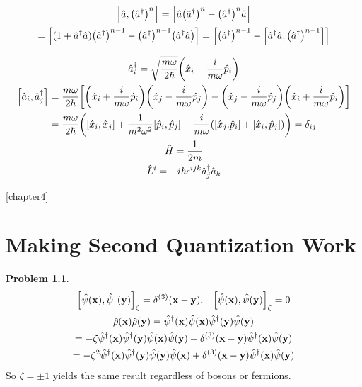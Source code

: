 \documentclass{report}
\theoremstyle{definition}
\begin{document}
\begin{chapter3}
	\begin{gather*}
		\bqty{\hat{a},\pqty{\hat{a}^{\dagger}}^n} = \bqty{\hat{a}\pqty{\hat{a}^{\dagger}}^n - \pqty{\hat{a}^{\dagger}}^n\hat{a}} \\
		= \bqty{(1+\hat{a}^{\dagger}\hat{a})\pqty{\hat{a}^{\dagger}}^{n-1} - \pqty{\hat{a}^{\dagger}}^{n-1}\pqty{\hat{a}^{\dagger}\hat{a}}} = \bqty{\pqty{\hat{a}^{\dagger}}^{n-1} - \bqty{\hat{a}^{\dagger}\hat{a},\pqty{\hat{a}^{\dagger}}^{n-1}}}		
	\end{gather*}	
\end{chapter3}

\begin{chapter3}
	\begin{gather*}
		\hat{a}_i^{\dagger} = \sqrt{\frac{m\omega}{2\hbar}}\pqty{\hat{x}_i - \frac{i}{m\omega}\hat{p}_i} \\
		\bqty{\hat{a}_i,\hat{a}_j^{\dagger}} = \frac{m\omega}{2\hbar}\bqty{\pqty{\hat{x}_i + \frac{i}{m\omega}\hat{p}_i}\pqty{\hat{x}_j - \frac{i}{m\omega}\hat{p}_j} - \pqty{\hat{x}_j - \frac{i}{m\omega}\hat{p}_j}\pqty{\hat{x}_i + \frac{i}{m\omega}\hat{p}_i}} \\
		= \frac{m\omega}{2\hbar}\pqty{\bqty{\hat{x}_i,\hat{x}_j} + \frac{1}{m^2\omega^2}\bqty{\hat{p}_i,\hat{p}_j} - \frac{i}{m\omega}\pqty{\bqty{\hat{x}_j.\hat{p}_i} + \bqty{\hat{x}_i,\hat{p}_j}}} = \delta_{ij} \\
		\hat{H} = \frac{1}{2m}\\
		\hat{L}^i = -i\hbar\epsilon^{ijk}\hat{a}^{\dagger}_j\hat{a}_k		
	\end{gather*}
\end{chapter3}

\newtheorem{chapter4}{Problem}
[chapter4]
\chapter{Making Second Quantization Work}

\begin{chapter4}
	\begin{gather*}
		\bqty{\hat{\psi}\pqty{\bf x}, \hat{\psi}^{\dagger}\pqty{\bf y}}_{\zeta} = \delta^{\pqty{3}}\pqty{\bf x - y},\;\;\; \bqty{\hat{\psi}\pqty{\bf x}, \hat{\psi}\pqty{\bf y}}_{\zeta} = 0 \\
		\hat{\rho}\pqty{\bf x}\hat{\rho}\pqty{\bf y} = \hat{\psi}^{\dagger}\pqty{\bf x}\hat{\psi}\pqty{\bf x}\hat{\psi}^{\dagger}\pqty{\bf y}\hat{\psi}\pqty{\bf y} \\
		= -\zeta\hat{\psi}^{\dagger}\pqty{\bf x}\hat{\psi}^{\dagger}\pqty{\bf y}\hat{\psi}\pqty{\bf x}\hat{\psi}\pqty{\bf y} + \delta^{\pqty{3}}\pqty{\bf x - y}\hat{\psi}^{\dagger}\pqty{\bf x}\hat{\psi}\pqty{\bf y} \\
		= -\zeta^2\hat{\psi}^{\dagger}\pqty{\bf x}\hat{\psi}^{\dagger}\pqty{\bf y}\hat{\psi}\pqty{\bf y}\hat{\psi}\pqty{\bf x} + \delta^{\pqty{3}}\pqty{\bf x - y}\hat{\psi}^{\dagger}\pqty{\bf x}\hat{\psi}\pqty{\bf y}
	\end{gather*}
	So $\zeta = \pm 1$ yields the same result regardless of bosons or fermions.
\end{chapter4}
\end{document}
